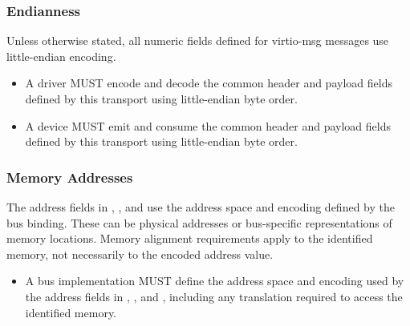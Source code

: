 \subsubsection{Endianness}
\label{sec:Virtio Transport Options / Virtio Over Messages / Basic Concepts / Endianness}

Unless otherwise stated, all numeric fields defined for virtio-msg messages use
little-endian encoding.

\begin{itemize}
  \item A driver MUST encode and decode the common header and payload fields
        defined by this transport using little-endian byte order.
\end{itemize}

\begin{itemize}
  \item A device MUST emit and consume the common header and payload fields
        defined by this transport using little-endian byte order.
\end{itemize}

\subsubsection{Memory Addresses}
\label{sec:Virtio Transport Options / Virtio Over Messages / Basic Concepts / Memory Addresses}

The address fields in , , and
 use the address space and encoding defined by the bus binding.
These can be physical addresses or bus-specific representations of memory
locations. Memory alignment requirements apply to the identified memory, not
necessarily to the encoded address value.

\begin{itemize}
  \item A bus implementation MUST define the address space and encoding used by
        the address fields in , , and
        , including any translation required to access the
        identified memory.
\end{itemize}

